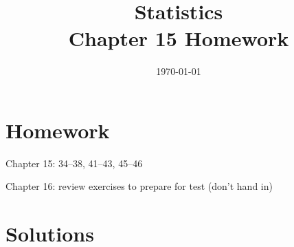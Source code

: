 \documentclass[letterpaper]{exam}
\title{Statistics \\ Chapter 15 Homework}
\date{\today}
\author{}
\begin{document}
  \maketitle

  \section{Homework}
  \begin{itemize*}
    \item Chapter 15: 34--38, 41--43, 45--46
    \item Chapter 16: review exercises to prepare for test (don't hand in)
  \end{itemize*}

  \ifprintanswers{}
    \section{Solutions}
\end{document}
